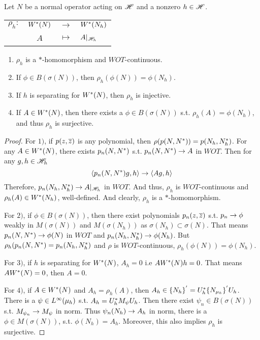 \documentclass[a4paper,11pt]{report}
\begin{document}
\begin{prop}
	Let $N$ be a normal operator acting on $\mathscr{H}$ and a nonzero $h \in \mathscr{H}$.
	\begin{center}
		\begin{tabular}{l c c l}
			$\rho_h \colon$ & $W^{*}(N)$ & $\longrightarrow$ & $W^{*}(N_h)$ \\
			~ & $A$ & $\longmapsto$ & $A|_{\mathscr{H}_h}$
		\end{tabular}
	\end{center}
	\begin{enumerate}[label=\arabic*)]
		\item $\rho_h$ is a $*$-homomorphism and $WOT$-continuous.
		\item If $\phi \in B(\sigma(N))$, then $\rho_h(\phi(N)) = \phi(N_h)$.
		\item If $h$ is separating for $W^{*}(N)$, then $\rho_h$ is injective.
		\item If $A \in W^{*}(N)$, then there exists a $\phi \in B(\sigma(N))$ s.t. $\rho_h(A) = \phi(N_h)$, and thus $\rho_h$ is surjective.
	\end{enumerate}
\end{prop}
\begin{proof}
	For $1)$, if $p(z,\overline{z})$ is any polynomial, then $\rho(p(N,N^{*})) = p(N_h,N_h^{*})$. For any $A \in W^{*}(N)$, there exists $p_n(N,N^{*})$ s.t. $p_n(N,N^{*}) \rightarrow A$ in $WOT$. Then for any $g,h \in \mathscr{H}_h$
	\begin{equation*}
		\langle p_n(N,N^{*})g,h \rangle \rightarrow \langle Ag,h \rangle
	\end{equation*}
	Therefore, $p_n(N_h,N_h^{*}) \rightarrow A|_{\mathscr{H}_h}$ in $WOT$. And thus, $\rho_h$ is $WOT$-continuous and $\rho_h(A) \in W^{*}(N_h)$, well-defined. And clearly, $\rho_h$ is a $*$-homomorphism.

	\item For $2)$, if $\phi \in B(\sigma(N))$, then there exist polynomials $p_n(z,\overline{z})$ s.t. $p_n \rightarrow \phi$ weakly in $M(\sigma(N))$ and $M(\sigma(N_h))$ as $\sigma(N_h) \subset \sigma(N)$. That means $p_n(N,N^{*}) \rightarrow \phi(N)$ in $WOT$ and $p_n(N_h,N_h^{*}) \rightarrow \phi(N_h)$. But $\rho_h(p_n(N,N^{*}) = p_n(N_h,N_h^{*})$ and $\rho$ is $WOT$-continuous, $\rho_h(\phi(N)) = \phi(N_h)$.

	\item For $3)$, if $h$ is separating for $W^{*}(N)$, $A_h = 0$ i.e $AW^{*}(N)h = 0$. That means $AW^{*}(N)=0$, then $A = 0$.

	\item For $4)$, if $A \in W^{*}(N)$ and $A_h = \rho_h(A)$, then $A_h \in \{N_h\}^{'} =U_h^{*}\{N_{\mu_h}\}^{'}U_h$. There is a $\psi \in L^{\infty}(\mu_h)$ s.t. $A_h = U_h^{*}M_{\psi} U_h$. Then there exist $\psi_n \in B(\sigma(N))$ s.t. $M_{\psi_n} \rightarrow M_{\psi}$ in norm. Thus $\psi_n(N_h) \rightarrow A_h$ in norm, there is a $\phi \in M(\sigma(N))$, s.t. $\phi(N_h) = A_h$. Moreover, this also implies $\rho_h$ is surjective.
\end{proof}
\end{document}

